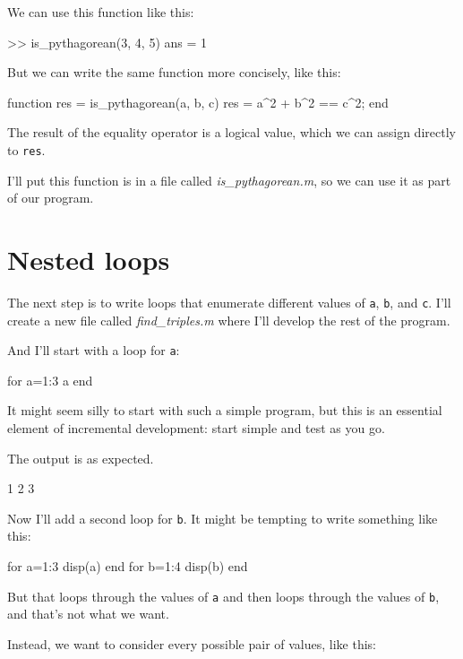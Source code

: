 We can use this function like this:

\begin{code}
>> is_pythagorean(3, 4, 5)
ans = 1
\end{code}

But we can write the same function more concisely, like this:

\begin{code}
function res = is_pythagorean(a, b, c)
    res = a^2 + b^2 == c^2;
end
\end{code}

The result of the equality operator is a logical value, which we can assign directly 
to {\tt res}.

I'll put this function is in a file called {\em is\_pythagorean.m}, so we can use it as part of our program.


\section{Nested loops}

The next step is to write loops that enumerate different values of {\tt a}, {\tt b}, and 
{\tt c}.  I'll create a new file called {\em find\_triples.m} where I'll develop the rest of the program.


And I'll start with a loop for {\tt a}:

\begin{code}
for a=1:3
    a
end
\end{code}

It might seem silly to start with such a simple program, but this is an essential element of incremental development: start simple and test as you go.

The output is as expected.

\begin{code}
1
2
3
\end{code}

Now I'll add a second loop for {\tt b}.  It might be tempting to write something like this:

\begin{code}
for a=1:3
    disp(a)
end
for b=1:4
    disp(b)
end
\end{code}

But that loops through the values of {\tt a} and then loops through the values of {\tt b}, and that's not what we want.

Instead, we want to consider every possible pair of values, like this:

